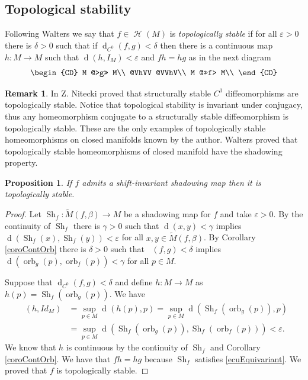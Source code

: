 \documentclass[12pt]{amsart}
\DeclareMathOperator{\ho}{\mathcal{H}}
\DeclareMathOperator{\homeo}{\ho}
\theoremstyle{plain}
\newtheorem{prop}[thm]{Proposition}
\theoremstyle{definition}
\newtheorem{rmk}[thm]{Remark}
\theoremstyle{remark}
\DeclareMathOperator{\dist}{d}
\DeclareMathOperator{\distcc}{\dist_{C^0}}
\DeclareMathOperator{\orb}{orb}
\DeclareMathOperator{\shm}{Sh}
\renewcommand{\epsilon}{\varepsilon}
\newcommand{\tM}{\tilde{M}}
\begin{document}
\subsection{Topological stability}
\label{secTopoEst}
Following Walters \cites{Walters1970,Walters1978} we say that $f\in\homeo(M)$ is \textit{topologically stable} if
for all $\epsilon>0$ there is $\delta>0$ such that
if $\dist_{C^0}(f,g)<\delta$ then there is a continuous map
$h\colon M\to M$ such that
$\dist(h,I_M)<\epsilon$ and $fh=hg$ as in the next diagram
\[
\begin{CD}
	M @>g>> M\\
	@VhVV @VVhV\\
	M @>>f> M\\
\end{CD}
\]
\begin{rmk}
	In \cite{Ni71} Z. Nitecki proved that structurally stable $C^1$ diffeomorphisms are topologically stable.
	Notice that topological stability is invariant under conjugacy, thus any homeomorphism conjugate to a structurally stable diffeomorphism is topologically stable. These are the only examples of topologically stable homeomorphisms on closed manifolds known by the author.
	Walters \cite{Walters1978} proved that topologically stable homeomorphisms of closed manifold have the shadowing property.
\end{rmk}

\begin{prop}
	If $f$ admits a shift-invariant shadowing map then it is topologically stable.
\end{prop}

\begin{proof}
	Let $\shm_f\colon \tM(f,\beta)\to M$ be a shadowing map for $f$ and take $\epsilon>0$.
	By the continuity of $\shm_f$ there is $\gamma>0$ such that $\dist(x,y)<\gamma$ implies
	$\dist(\shm_f(x),\shm_f(y))<\epsilon$ for all $x,y\in \tM(f,\beta)$.
	By Corollary \ref{coroContOrb} there is $\delta>0$ such that
	$\distcc(f,g)<\delta$ implies $\dist(\orb_g(p),\orb_f(p))<\gamma$ for all $p\in M$.

	Suppose that $\dist_{C^0}(f,g)<\delta$ and
	define $h\colon M\to M$ as
	$h(p)=\shm_f(\orb_g(p))$.
	We have
	\[
	\begin{array}{rl}
		\distcc(h,Id_M) & \displaystyle =\sup_{p\in M}\dist(h(p),p) =\sup_{p\in M}\dist(\shm_f(\orb_g(p)),p)\\
		& \displaystyle =\sup_{p\in M}\dist(\shm_f(\orb_g(p)),\shm_f(\orb_f(p)))<\epsilon.
	\end{array}
	\]
	We know that $h$ is continuous by the continuity of $\shm_f$ and Corollary \ref{coroContOrb}.
	We have that $fh=hg$ because $\shm_f$ satisfies \eqref{ecuEquivariant}. We proved that $f$ is topologically stable.
\end{proof}
\end{document}
